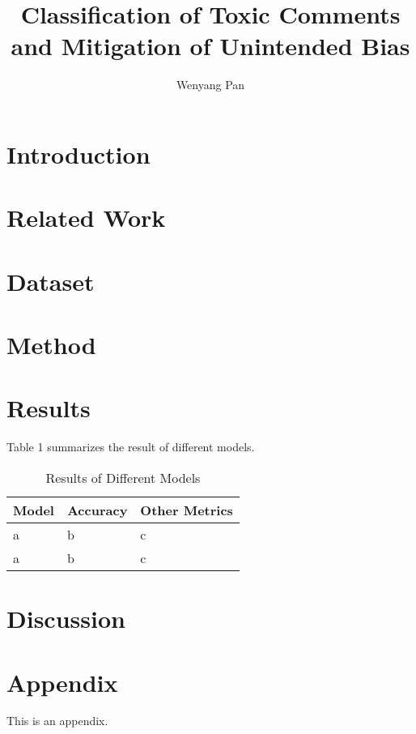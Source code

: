 \documentclass[11pt]{article}
\title{Classification of Toxic Comments and Mitigation of Unintended Bias}
\author{Wenyang Pan}
\begin{document}
\maketitle

\begin{abstract}

\end{abstract}

\section{Introduction}

\section{Related Work}

\citep{mitchell2019model}

\section{Dataset}

\section{Method}

\section{Results}
Table 1 summarizes the result of different models. 

\begin{table}
\centering
\begin{tabular}{lll}
\hline
\textbf{Model} & \textbf{Accuracy} & \textbf{Other Metrics} \\
\hline
a & b & c \\
a & b & c \\ 
\hline
\end{tabular}
\caption{Results of Different Models}
\label{tab:accents}
\end{table}

\section{Discussion}




\appendix

\section{Appendix}
\label{sec:appendix}

This is an appendix.
\end{document}
